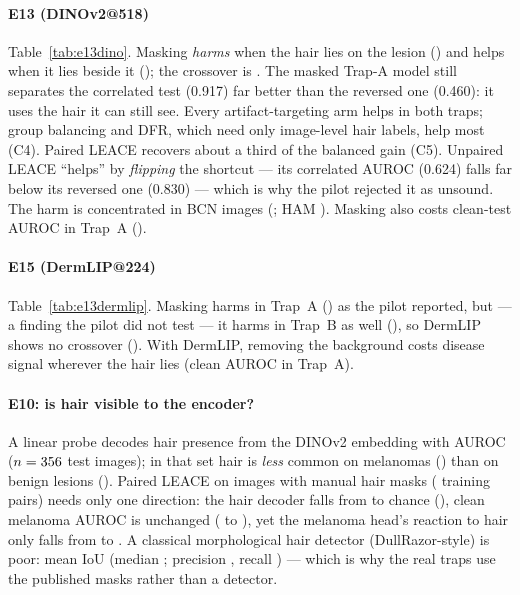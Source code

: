 \paragraph{E13 (DINOv2@518)} Table~\ref{tab:e13dino}. Masking \emph{harms} when the hair lies on the lesion
(\sOneAdino) and helps when it lies beside it (\sOneBdino); the crossover is \sOneXdino. The masked Trap-A model still
separates the correlated test (0.917) far better than the reversed one (0.460): it uses the hair it can still see.
Every artifact-targeting arm helps in both traps; group balancing and DFR, which need only image-level hair labels,
help most (C4). Paired LEACE recovers about a third of the balanced gain (C5). Unpaired LEACE ``helps'' by
\emph{flipping} the shortcut --- its correlated AUROC (0.624) falls far below its reversed one (0.830) --- which is why
the pilot rejected it as unsound. The harm is concentrated in BCN images (\sOneSrcdinoBCN; HAM \sOneSrcdinoHAM).
Masking also costs clean-test AUROC in Trap~A (\sOneACleandino).

\paragraph{E15 (DermLIP@224)} Table~\ref{tab:e13dermlip}. Masking harms in Trap~A (\sOneAdermlip) as the pilot
reported, but --- a finding the pilot did not test --- it harms in Trap~B as well (\sOneBdermlip), so DermLIP shows no
crossover (\sOneXdermlip). With DermLIP, removing the background costs disease signal wherever the hair lies (clean
AUROC \sOneACleandermlip{} in Trap~A).

\paragraph{E10: is hair visible to the encoder?} A linear probe decodes hair presence from the DINOv2 embedding with
AUROC \sOneHairDec{} ($n=356$ test images); in that set hair is \emph{less} common on melanomas
(\sOneHairPMel) than on benign lesions (\sOneHairPBen). Paired LEACE on \sOneLeaceN{} images with manual hair masks
(\sOneLeaceTrain{} training pairs) needs only one direction: the hair decoder falls from \sOneLeaceDecRaw{} to chance
(\sOneLeaceDecAfter), clean melanoma AUROC is unchanged (\sOneLeaceCleanRaw{} to \sOneLeaceCleanAfter), yet the
melanoma head's reaction to hair only falls from \sOneLeaceDpRaw{} to \sOneLeaceDpAfter. A classical morphological
hair detector (DullRazor-style) is poor: mean IoU \sOneDetIoU{} (median \sOneDetIoUMed; precision \sOneDetP, recall
\sOneDetR) --- which is why the real traps use the published masks rather than a detector.
